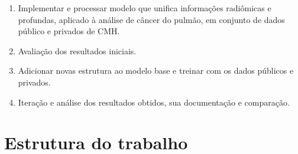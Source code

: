 \begin{enumerate}

\item Implementar e processar modelo que unifica informações radiômicas e profundas, aplicado à análise de câncer do pulmão, em conjunto de dados público e privados de \gls{CMH}.

\item Avaliação dos resultados iniciais.

\item Adicionar novas estrutura ao modelo base e treinar com os dados públicos e privados.

\item Iteração e análise dos resultados obtidos, sua documentação e comparação.






\end{enumerate}

\section{Estrutura do trabalho}
\label{sec:cap1_estrutura_trabalho}

